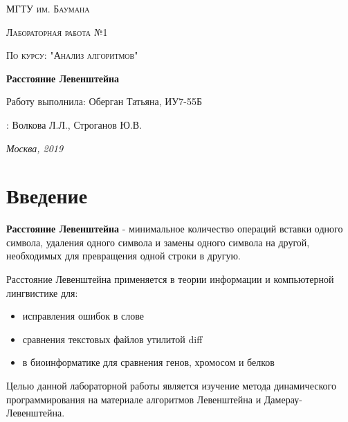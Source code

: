 \documentclass[12pt]{report}
\begin{document}
\begin{titlepage}
	\centering
	{\scshape\LARGE МГТУ им. Баумана \par}
	\vspace{3cm}
	{\scshape\Large Лабораторная работа №1\par}
	\vspace{0.5cm}	
	{\scshape\Large По курсу: "Анализ алгоритмов"\par}
	\vspace{1.5cm}
	{\huge\bfseries Расстояние Левенштейна\par}
	\vspace{2cm}
	\Large Работу выполнила: Оберган Татьяна, ИУ7-55Б\par
	\vspace{0.5cm}
	:  Волкова Л.Л., Строганов Ю.В.\par

	\vfill
	\large \textit {Москва, 2019} \par
\end{titlepage}

\tableofcontents

\newpage
\chapter*{Введение}
\textbf{Расстояние Левенштейна} - минимальное количество операций вставки одного символа, удаления одного символа и замены одного символа на другой, необходимых для превращения одной строки в другую.

Расстояние Левенштейна применяется в теории информации и компьютерной лингвистике для:

\begin{itemize}
	\item исправления ошибок в слове
	\item сравнения текстовых файлов утилитой diff
	\item в биоинформатике для сравнения генов, хромосом и белков
\end{itemize}

Целью данной лабораторной работы является изучение метода динамического программирования на материале алгоритмов
Левенштейна и Дамерау-Левенштейна. 
\end{document}
